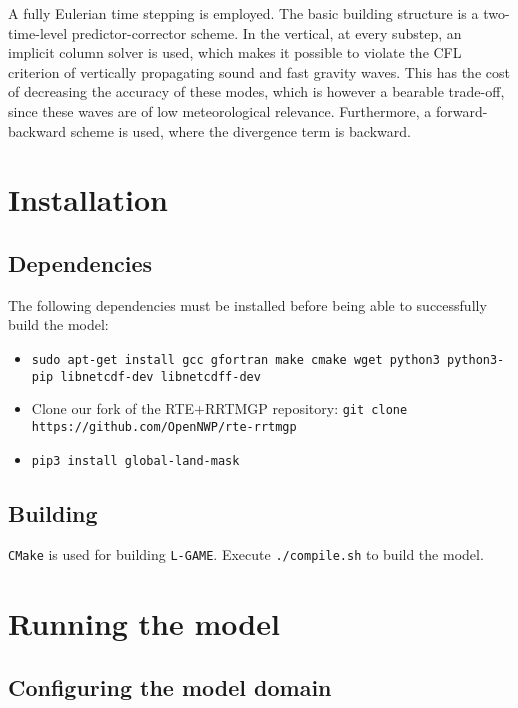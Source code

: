 \documentclass[10pt]{report}
\begin{document}
A fully Eulerian time stepping is employed. The basic building structure is a two-time-level predictor-corrector scheme. In the vertical, at every substep, an implicit column solver is used, which makes it possible to violate the CFL criterion of vertically propagating sound and fast gravity waves. This has the cost of decreasing the accuracy of these modes, which is however a bearable trade-off, since these waves are of low meteorological relevance. Furthermore, a forward-backward scheme is used, where the divergence term is backward.

\chapter{Installation}
\label{chap:installation}

\section{Dependencies}
\label{sec:dependencies}

The following dependencies must be installed before being able to successfully build the model:

\begin{itemize}
\item \texttt{sudo apt-get install gcc gfortran make cmake wget python3 python3-pip libnetcdf-dev libnetcdff-dev}
\item Clone our fork of the RTE+RRTMGP repository: \texttt{git clone https://github.com/OpenNWP/rte-rrtmgp}
\item \texttt{pip3 install global-land-mask}
\end{itemize}

\section{Building}
\label{sec:building}

\texttt{CMake} is used for building \texttt{L-GAME}. Execute \texttt{./compile.sh} to build the model.

\chapter{Running the model}
\label{chap:running_the_model}

\section{Configuring the model domain}
\label{sec:configuring_the_model_domain}
\end{document}
